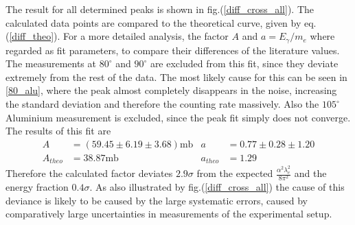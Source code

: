\documentclass{article}
\begin{document}
The result for all determined peaks is shown in fig.(\ref{diff_cross_all}).
The calculated data points are compared to the theoretical curve, given by eq.(\ref{diff_theo}).
For a more detailed analysis, the factor $A$ and $a = E_\gamma / m_e$ where regarded as fit parameters, to compare their differences of the literature values.
The measurements at $80^\circ$ and $90^\circ$ are excluded from this fit, since they deviate extremely from the rest of the data. The most likely cause for this can be seen in \ref{80_alu}, where the peak almost completely disappears in the noise, increasing the standard deviation and therefore the counting rate massively.
Also the $105^\circ$ Aluminium measurement is excluded, since the peak fit simply does not converge.
The results of this fit are
\begin{align*}
    A &= (59.45 \pm  6.19 \pm  3.68)\mbox{mb}  &a&= 0.77 \pm  0.28 \pm  1.20\\
    A_{theo} &= 38.87 \mbox{mb}               &a_{theo} &= 1.29
\end{align*}
Therefore the calculated factor deviates $2.9\sigma$ from the expected $\frac{\alpha^2\lambda_e^2}{8\pi^2}$ and the energy fraction $0.4\sigma$.
As also illustrated by fig.(\ref{diff_cross_all}) the cause of this deviance is likely to be caused by the large systematic errors, caused by comparatively large uncertainties in measurements of the experimental setup.
\end{document}
